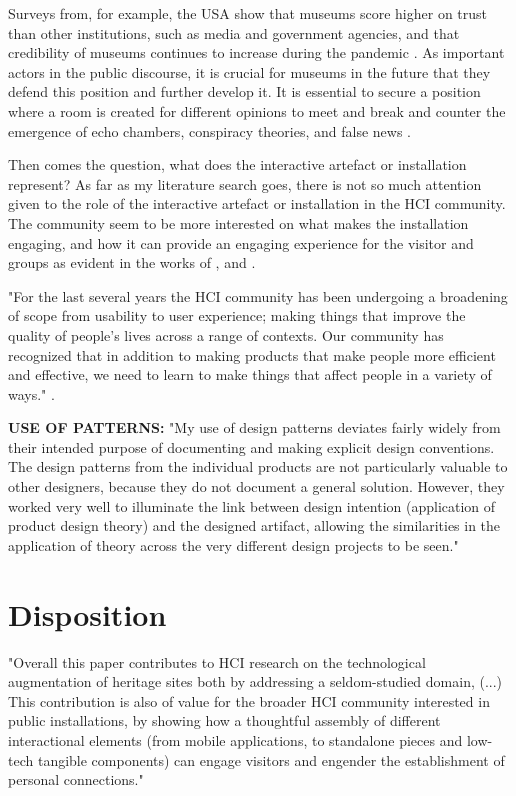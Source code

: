 Surveys from, for example, the USA show that museums score higher on trust than other institutions, such as media and government agencies, and that credibility of museums continues to increase during the pandemic \autocite{impact_2020}. As important actors in the public discourse, it is crucial for museums in the future that they defend this position and further develop it. It is essential to secure a position where a room is created for different opinions to meet and break and counter the emergence of echo chambers, conspiracy theories, and false news \autocite[p. 41]{melding23}.


Then comes the question, what does the interactive artefact or installation represent? As far as my literature search goes, there is not so much attention given to the role of the interactive artefact or installation in the HCI community. The community seem to be more interested on what makes the installation engaging, and how it can provide an engaging experience for the visitor and groups as evident in the works of \autocite{hornecker_learning_2006}, and \autocite{ciolfi_designing_2012}.

"For the last several years the HCI community has been undergoing a broadening of scope from usability to user experience; making things that improve the quality of people’s lives across a range of contexts. Our community has recognized that in addition to making products that make people more efficient and effective, we need to learn to make things that affect people in a variety of ways." \autocite[p. 395]{zimmerman_designing_2009}. 

\textbf{USE OF PATTERNS:} "My use of design patterns deviates fairly widely from their intended purpose of documenting and making explicit design conventions. The design patterns from the individual products are not particularly valuable to other designers, because they do not document a general solution. However, they worked very well to illuminate the link between design intention (application of product design theory) and the designed artifact, allowing the similarities in the application of theory across the very different design projects to be seen." \autocite[p. 402]{zimmerman_designing_2009}




\section{Disposition}

"Overall this paper contributes to HCI research on the technological augmentation of heritage sites both by addressing a seldom-studied domain, (...) This contribution is also of value for the broader HCI community interested in public installations, by showing how a thoughtful assembly of different interactional elements (from mobile applications, to standalone pieces and low-tech tangible components) can engage visitors and engender the establishment of personal connections." \autocite{ciolfi_designing_2012}


